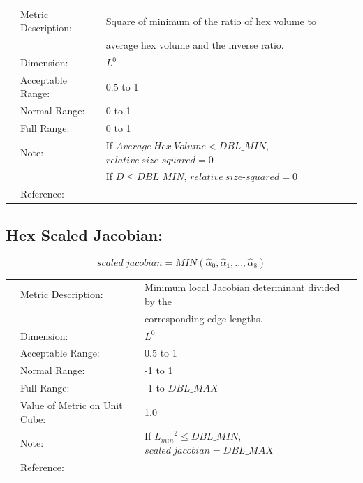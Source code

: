 \documentclass[12pt]{article}
\begin{document}
\begin{tabular}{lll}
& Metric Description:  & Square of minimum of the ratio of hex volume to  \\
&                      & average hex volume and the inverse ratio.\\
& Dimension:           & $L^0$       \\ 
& Acceptable Range:    & 0.5 to 1 \\ 
& Normal Range:        & 0 to 1 \\ 
& Full Range:          & 0 to 1 \\ 
& Note:                & If $Average~Hex~Volume < DBL\_MIN$, $relative~size \textrm{-}squared = 0$ \\ 
&                      & If $D \leq DBL\_MIN$, $relative~size \textrm{-}squared = 0$ \\ 
& Reference:           & \cite{four} \\
\end{tabular} 


\subsection*{Hex Scaled Jacobian:}

\begin{displaymath}
scaled~jacobian = MIN \left( \hat \alpha_0,
                             \hat \alpha_1,...,
                             \hat \alpha_8 \right)
\end{displaymath}

\begin{tabular}{lll}
& Metric Description:  & Minimum local Jacobian determinant divided by the \\ 
&                      & corresponding edge-lengths. \\
& Dimension:           & $L^0$       \\ 
& Acceptable Range:    & 0.5 to 1 \\ 
& Normal Range:        & -1 to 1 \\ 
& Full Range:          & -1 to $DBL\_MAX$ \\ 
& Value of Metric on Unit Cube:    & 1.0 \\
& Note:                & If ${L_{min}}^2 \leq DBL\_MIN$, $scaled~jacobian = DBL\_MAX$ \\ 
& Reference:           & \cite{three} \\
\end{tabular} 
\end{document}
